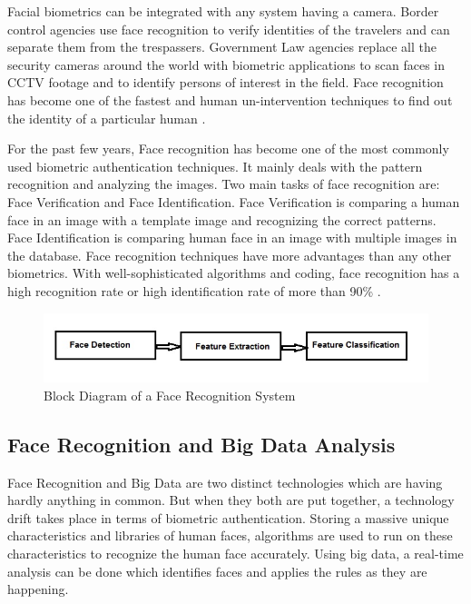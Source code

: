 \documentclass[sigconf]{acmart}
\begin{document}
Facial biometrics can be integrated with any system having a camera. Border control agencies 
use face recognition to verify identities of the travelers and can separate them from the 
trespassers. Government Law agencies replace all the security cameras around the world with 
biometric applications to scan faces in CCTV footage and to identify persons of interest 
in the field. Face recognition has become one of the fastest and human un-intervention 
techniques to find out the identity of a particular human \cite{biometrics2016}.

For the past few years, Face recognition has become one of the most commonly used 
biometric authentication techniques. It mainly deals with the pattern recognition 
and analyzing the images. Two main tasks of face recognition are: Face Verification 
and Face Identification. Face Verification is comparing a human face in an image with 
a template image and recognizing the correct patterns. Face Identification is comparing 
human face in an image with multiple images in the database. Face recognition 
techniques have more advantages than any other biometrics. With well-sophisticated 
algorithms and coding, face recognition has a high recognition rate or high 
identification rate of more than 90\% \cite{riddhi2013}. 

\begin{figure}[ht!]
  \includegraphics[width=\columnwidth]{images/Face-recognition.jpg}
  \caption{Block Diagram of a Face Recognition System}
\end{figure}

\subsection{Face Recognition and Big Data Analysis}

Face Recognition and Big Data are two distinct technologies which are having hardly 
anything in common. But when they both are put together, a technology drift takes 
place in terms of biometric authentication. Storing a massive unique characteristics 
and libraries of human faces, algorithms are used to run on these characteristics 
to recognize the human face accurately. Using big data, a real-time analysis can 
be done which identifies faces and applies the rules as they are happening.
\end{document}
